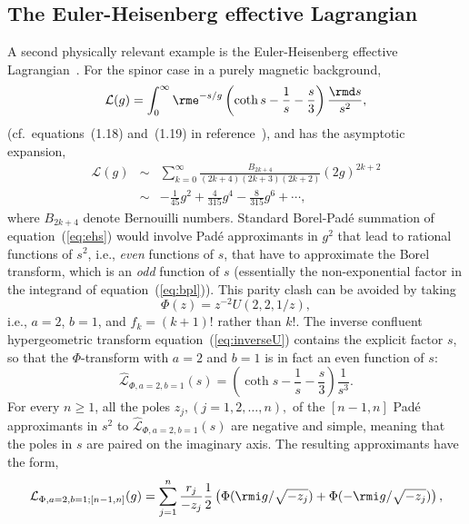 \documentclass[12pt]{iopart}
\begin{document}
\subsection{The Euler-Heisenberg effective Lagrangian}
A second physically relevant example 
is the Euler-Heisenberg effective Lagrangian~\cite{HE36,DU04}. For the spinor case
in a purely magnetic background,
%
\begin{equation}
	\label{eq:bpl}
	\mathcal{L}(g) = \int_0^\infty{\rme}^{-s/g} \left(\coth s - \frac{1}{s} - \frac{s}{3}\right)\frac{\rmd s}{s^2},
\end{equation}
(cf.~equations~(1.18) and~(1.19) in reference~\cite{DU04}), and has the asymptotic expansion,
%
\begin{eqnarray}
	\label{eq:ehs}
	\mathcal{L}(g) & \sim & \sum_{k=0}^\infty \frac{B_{2k+4}}{(2k+4)(2k+3)(2k+2)}(2g)^{2k+2}
\\
	\label{eq:ehss}
	 & \sim & -\frac{1}{45}g^2 + \frac{4}{315} g^4 -\frac{8}{315} g^6 +\cdots,
\end{eqnarray}
%
where $B_{2k+4}$ denote Bernouilli numbers.
%
Standard Borel-Pad\'e summation of equation~(\ref{eq:ehs}) would involve Pad\'e approximants in $g^2$ that lead to rational functions of $s^2$, i.e., {\em even} functions of $s$, that have to approximate the Borel transform, which is an {\em odd} function of $s$ (essentially the non-exponential factor in the integrand of equation~(\ref{eq:bpl})). 
%
This parity clash can be avoided by taking 
%
\begin{equation}
	\label{eq:EH21}
	\Phi( z ) = z^{-2}U(2,2,1/z),
\end{equation}
%
i.e., $a=2$, $b=1$, and $f_k=(k+1)!$ rather than $k!$.
%
The inverse confluent hypergeometric transform equation~(\ref{eq:inverseU}) contains the explicit factor $s$, so that the $\Phi$-transform
with $a=2$ and $b=1$ is in fact an even function of $s$:
%
\begin{equation}
	\label{eq:L21}
	\hat{\mathcal{L}}_{ \Phi,a=2,b=1} (s) = \left(\coth s - \frac{1}{s} - \frac{s}{3}\right)\frac{1}{s^3}.
\end{equation}
%
For every $n\ge 1$, all the poles $z_j, (j=1,2,\ldots,n),$ of the $[n-1,n]$ Pad\'e approximants in $s^2$ to $\hat{\mathcal{L}}_{ \Phi,a=2,b=1} (s)$ are negative and simple, meaning that the poles in $s$ are paired on the imaginary axis. The resulting approximants have the form,
%
\begin{equation}
  \mathcal{L}_{ \Phi,a=2,b=1;[n-1,n]} (g) = 
  \sum_{j=1}^n
  \frac{r_j}{-z_j}
   \frac{1}{2}
   \left( 
   \Phi(\rmi g/\sqrt{-z_j}) +  \Phi(-\rmi g/\sqrt{-z_j})
  \right) ,
\label{eq:EHG1}
\end{equation}
\end{document}
